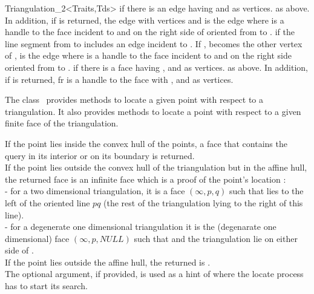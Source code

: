\begin{ccRefClass}{Triangulation_2<Traits,Tds>}
{ if there is an edge having  and  as
vertices.}
\ccGlue
{}
{ as above. In addition, if  is returned,  the edge with
vertices  and  is the edge  where
 is a handle to the face incident to  and 
on the right side of   oriented from  to .}
\ccGlue
{}
{ if the line segment from  to  includes
an edge  incident to . If ,  becomes
the other vertex of ,  is the edge  where
 is a handle to the face incident to  and 
on the right side  oriented from  to .}
\ccGlue
{}
{ if there is a face having ,  and  
as vertices.}
\ccGlue
{}
{as above. In addition, if  is returned, fr is a handle
to the face with  ,  and  
as vertices.} 


The class \ccRefName\  provides methods to locate
a given point with respect to a triangulation. It also provides
methods to locate a point with respect to
a given  finite face of the triangulation.

{If the point  lies inside the convex hull of the points, a face 
that contains the query in its interior or on its
 boundary is returned.\\
If the point  lies outside the convex hull of the
triangulation but in the affine hull,
the returned face is an infinite face which is a proof of the point's
location : \\
- for a two dimensional triangulation, it is a face $(\infty, p, q)$ 
such that
 lies to the left  of the oriented line $pq$ 
(the rest of the triangulation lying to the right of this line).\\
- for a degenerate one dimensional triangulation it is the (degenarate
one dimensional) face $(\infty, p, NULL)$ such that 
and the triangulation lie on either side of . \\
If the point  lies outside the affine hull,
the returned  is . \\
The optional  argument, if provided, is used as a hint
of where the locate process has to start its search.}


\end{ccRefClass}
